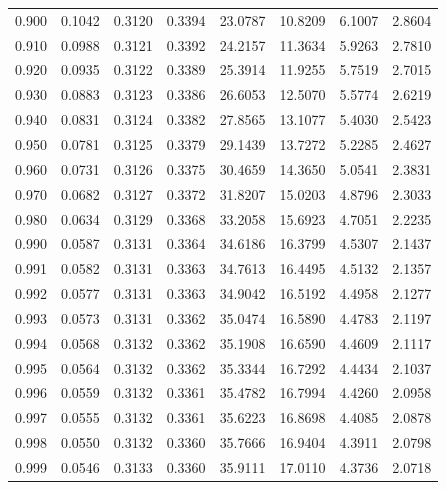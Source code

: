 \documentclass[10pt]{amsart}
\theoremstyle{definition}
\numberwithin{equation}{section}
\begin{document}
\begin{table}[h!]
\begin{tabular}{|c|c|c|c|c|c|c|c|}
0.900 & 0.1042 & 0.3120 & 0.3394 & 23.0787 & 10.8209 & 6.1007 & 2.8604 \\
0.910 & 0.0988 & 0.3121 & 0.3392 & 24.2157 & 11.3634 & 5.9263 & 2.7810 \\
0.920 & 0.0935 & 0.3122 & 0.3389 & 25.3914 & 11.9255 & 5.7519 & 2.7015 \\
0.930 & 0.0883 & 0.3123 & 0.3386 & 26.6053 & 12.5070 & 5.5774 & 2.6219 \\
0.940 & 0.0831 & 0.3124 & 0.3382 & 27.8565 & 13.1077 & 5.4030 & 2.5423 \\
0.950 & 0.0781 & 0.3125 & 0.3379 & 29.1439 & 13.7272 & 5.2285 & 2.4627 \\
0.960 & 0.0731 & 0.3126 & 0.3375 & 30.4659 & 14.3650 & 5.0541 & 2.3831 \\
0.970 & 0.0682 & 0.3127 & 0.3372 & 31.8207 & 15.0203 & 4.8796 & 2.3033 \\
0.980 & 0.0634 & 0.3129 & 0.3368 & 33.2058 & 15.6923 & 4.7051 & 2.2235 \\
0.990 & 0.0587 & 0.3131 & 0.3364 & 34.6186 & 16.3799 & 4.5307 & 2.1437 \\
0.991 & 0.0582 & 0.3131 & 0.3363 & 34.7613 & 16.4495 & 4.5132 & 2.1357 \\
0.992 & 0.0577 & 0.3131 & 0.3363 & 34.9042 & 16.5192 & 4.4958 & 2.1277 \\
0.993 & 0.0573 & 0.3131 & 0.3362 & 35.0474 & 16.5890 & 4.4783 & 2.1197 \\
0.994 & 0.0568 & 0.3132 & 0.3362 & 35.1908 & 16.6590 & 4.4609 & 2.1117 \\
0.995 & 0.0564 & 0.3132 & 0.3362 & 35.3344 & 16.7292 & 4.4434 & 2.1037 \\
0.996 & 0.0559 & 0.3132 & 0.3361 & 35.4782 & 16.7994 & 4.4260 & 2.0958 \\
0.997 & 0.0555 & 0.3132 & 0.3361 & 35.6223 & 16.8698 & 4.4085 & 2.0878 \\
0.998 & 0.0550 & 0.3132 & 0.3360 & 35.7666 & 16.9404 & 4.3911 & 2.0798 \\
0.999 & 0.0546 & 0.3133 & 0.3360 & 35.9111 & 17.0110 & 4.3736 & 2.0718 \\
\hline
\end{tabular}
\end{table}
\end{document}
